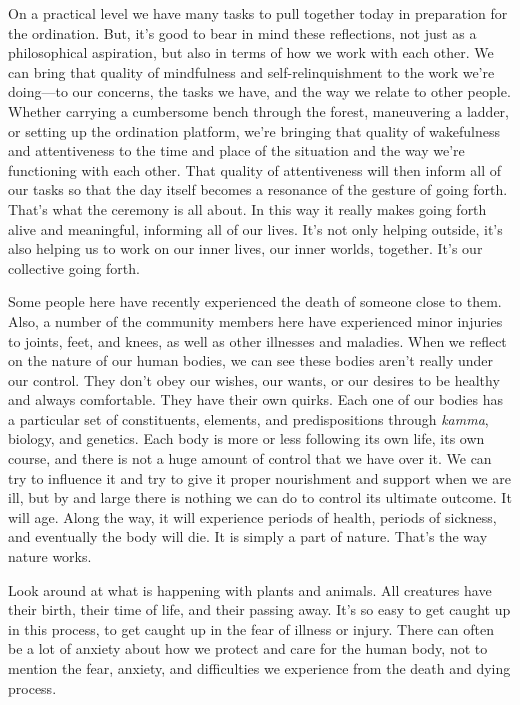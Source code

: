 On a practical level we have many tasks to pull together today in 
preparation for the ordination. But, it's good to bear in mind these 
reflections, not just as a philosophical aspiration, but also in terms 
of how we work with each other. We can bring that quality of 
mindfulness and self-relinquishment to the work we're doing---to our 
concerns, the tasks we have, and the way we relate to other people. 
Whether carrying a cumbersome bench through the forest, maneuvering a 
ladder, or setting up the ordination platform, we're bringing that 
quality of wakefulness and attentiveness to the time and place of the 
situation and the way we're functioning with each other. That quality 
of attentiveness will then inform all of our tasks so that the day 
itself becomes a resonance of the gesture of going forth. That's what 
the ceremony is all about. In this way it really makes going forth 
alive and meaningful, informing all of our lives. It's not only helping 
outside, it's also helping us to work on our inner lives, our inner 
worlds, together. It's our collective going forth.


Some people here have recently experienced the death of someone close 
to them. Also, a number of the community members here have experienced 
minor injuries to joints, feet, and knees, as well as other illnesses 
and maladies. When we reflect on the nature of our human bodies, we can 
see these bodies aren't really under our control. They don't obey our 
wishes, our wants, or our desires to be healthy and always comfortable. 
They have their own quirks. Each one of our bodies has a particular set 
of constituents, elements, and predispositions through \emph{kamma}, 
biology, and genetics. Each body is more or less following its own 
life, its own course, and there is not a huge amount of control that we 
have over it. We can try to influence it and try to give it proper 
nourishment and support when we are ill, but by and large there is 
nothing we can do to control its ultimate outcome. It will age. Along 
the way, it will experience periods of health, periods of sickness, and 
eventually the body will die. It is simply a part of nature. That's the 
way nature works.

Look around at what is happening with plants and animals. All creatures 
have their birth, their time of life, and their passing away. It's so 
easy to get caught up in this process, to get caught up in the fear of 
illness or injury. There can often be a lot of anxiety about how we 
protect and care for the human body, not to mention the fear, anxiety, 
and difficulties we experience from the death and dying process.

